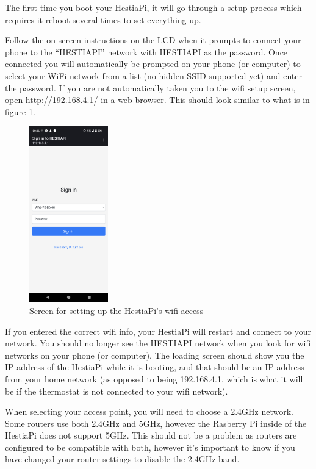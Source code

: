 The first time you boot your HestiaPi, it will go through a setup process which
requires it reboot several times to set everything up.

Follow the on-screen instructions on the LCD when it prompts to connect your
phone to the ``HESTIAPI'' network with HESTIAPI as the password. Once connected
you will automatically be prompted on your phone (or computer) to select your
WiFi network from a list (no hidden SSID supported yet) and enter the password.
If you are not automatically taken you to the wifi setup screen, open
\url{http://192.168.4.1/} in a web browser. This should look similar to what is
in figure \ref{fig:wifi_setup}.

\begin{figure}
  \centering
  \includegraphics[height=3in]{img/wifi-setup.png}
  \caption{Screen for setting up the HestiaPi's wifi access}
  \label{fig:wifi_setup}
\end{figure}

If you entered the correct wifi info, your HestiaPi will restart and connect to
your network. You should no longer see the HESTIAPI network when you look for
wifi networks on your phone (or computer). The loading screen should show you
the IP address of the HestiaPi while it is booting, and that should be an IP
address from your home network (as opposed to being 192.168.4.1, which is what
it will be if the thermostat is not connected to your wifi network).

When selecting your access point, you will need to choose a 2.4GHz network.
Some routers use both 2.4GHz and 5GHz, however the Rasberry Pi inside of the
HestiaPi does not support 5GHz. This should not be a problem as routers are
configured to be compatible with both, however it's important to know if you
have changed your router settings to disable the 2.4GHz band.

